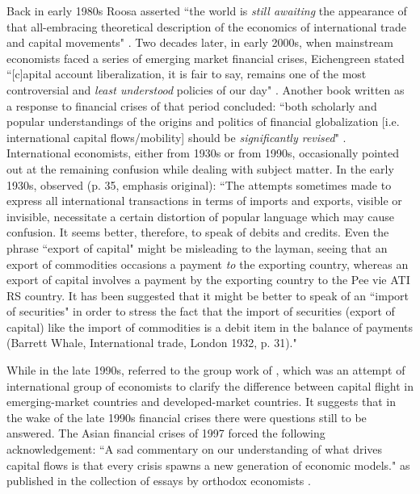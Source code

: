 Back in early 1980s Roosa asserted ``the world is \textit{still awaiting} the appearance of that all-embracing theoretical description of the economics of international trade and capital movements" \citep[p.~7, emphasis added]{roosa1983}.
Two decades later, in early 2000s, when mainstream economists faced a series of emerging market financial crises, Eichengreen stated ``[c]apital account liberalization, it is fair to say, remains one of the most controversial and \textit{least understood} policies of our day" \citep[p.~341, emphasis added]{eichengreen2001}.
Another book written as a response to financial crises of that period concluded: ``both scholarly and popular understandings of the origins and politics of financial globalization [i.e. international capital flows/mobility] should be \textit{significantly revised}" \citep[p.~3, emphasis added]{abdelal2007}. International economists, either from 1930s or from 1990s, occasionally pointed out at the remaining confusion while dealing with subject matter. In the early 1930s, \cite{iversen1936} observed (p. 35, emphasis original): ``The attempts sometimes made to express all international transactions in terms of imports and exports, visible or invisible, necessitate a certain distortion of popular language which may cause confusion. It seems better, therefore, to speak of debits and credits. Even the phrase ``export of capital" might be misleading to the layman, seeing that an export of commodities occasions a payment \textit{to} the exporting country, whereas an export of capital involves a payment by the exporting country to the Pee vie ATI RS country. It has been suggested that it might be better to speak of an ``import of securities" in order to stress the fact that the import of securities (export of capital) like the import of commodities is a debit item in the balance of payments (Barrett Whale, International trade, London 1932, p. 31)."

While in the late 1990s, \cite{kant2002} referred to the group work of \cite{abalkin1999}, which was an attempt of international group of economists to clarify the difference between capital flight in emerging-market countries and developed-market countries. It suggests that in the wake of the late 1990s financial crises there were questions still to be answered. The Asian financial crises of 1997 forced the following acknowledgement: ``A sad commentary on our understanding of what drives capital flows is that every crisis spawns a new generation of economic models." \citep[p.~58]{rodrik1998} as published in the collection of essays by orthodox economists \citep{princeton1998}.

